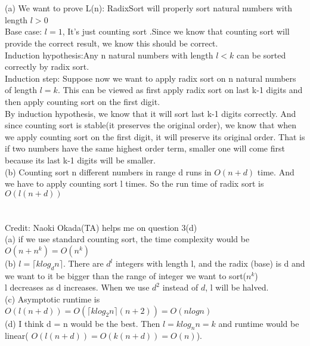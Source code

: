 \documentclass[12pt]{article}
\begin{document}
\pagebreak
\section{}
(a) We want to prove L(n): RadixSort will properly sort natural numbers with length $l>0$\\

Base case: $l = 1$, It's just counting sort .Since we know that counting sort will provide the correct result, we know this should be correct.\\

Induction hypothesis:Any n natural numbers with length $l< k $ can be sorted correctly by radix sort.\\

Induction step: Suppose now we want to apply radix sort on n natural numbers of length $l = k$. This can be viewed as first apply radix sort on last k-1 digits and then apply counting sort on the first digit.\\
By induction hypothesis, we know that it will sort last k-1 digits correctly. And since counting sort is stable(it preserves the original order), we know that when we apply counting sort on the first digit, it will preserve its original order. That is if two numbers have the same highest order term, smaller one will come first because its last k-1 digits will be smaller.\\


(b) Counting sort n different numbers in range d runs in $O(n+d)$ time. And we have to apply counting sort l times. So the run time of radix sort is $O(l(n+d))$

\pagebreak

\section{}
Credit: Naoki Okada(TA) helps me on question 3(d)\\

(a) if we use standard counting sort, the time complexity would be $O(n+n^k) = O(n^k)$\\

(b) $l = \lceil klog_dn \rceil$. There are $d^l$ integers with length l, and the radix (base) is d and we want to it be bigger than the range of integer we want to sort($n^k$)\\ 
l decreases as d increases. When we use $d^2$ instead of $d$, l will be halved.\\

(c) Asymptotic runtime is $O(l(n+d)) = O(\lceil klog_2n \rceil (n+2)) = O(nlogn)$\\

(d) I think d = n would be the best. Then $l = klog_nn = k $ and runtime would be linear( $O(l(n+d)) = O(k(n+d)) = O(n)$).
\end{document}
